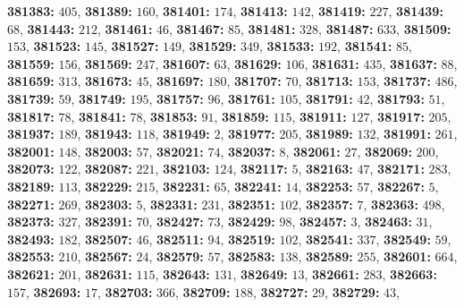 \textsf{\bfseries 381383:} $405$, \textsf{\bfseries 381389:} $160$, \textsf{\bfseries 381401:} $174$, \textsf{\bfseries 381413:} $142$, \textsf{\bfseries 381419:} $227$, \textsf{\bfseries 381439:} $68$, \textsf{\bfseries 381443:} $212$, \textsf{\bfseries 381461:} $46$, \textsf{\bfseries 381467:} $85$, \textsf{\bfseries 381481:} $328$, \textsf{\bfseries 381487:} $633$, \textsf{\bfseries 381509:} $153$, \textsf{\bfseries 381523:} $145$, \textsf{\bfseries 381527:} $149$, \textsf{\bfseries 381529:} $349$, \textsf{\bfseries 381533:} $192$, \textsf{\bfseries 381541:} $85$, \textsf{\bfseries 381559:} $156$, \textsf{\bfseries 381569:} $247$, \textsf{\bfseries 381607:} $63$, \textsf{\bfseries 381629:} $106$, \textsf{\bfseries 381631:} $435$, \textsf{\bfseries 381637:} $88$, \textsf{\bfseries 381659:} $313$, \textsf{\bfseries 381673:} $45$, \textsf{\bfseries 381697:} $180$, \textsf{\bfseries 381707:} $70$, \textsf{\bfseries 381713:} $153$, \textsf{\bfseries 381737:} $486$, \textsf{\bfseries 381739:} $59$, \textsf{\bfseries 381749:} $195$, \textsf{\bfseries 381757:} $96$, \textsf{\bfseries 381761:} $105$, \textsf{\bfseries 381791:} $42$, \textsf{\bfseries 381793:} $51$, \textsf{\bfseries 381817:} $78$, \textsf{\bfseries 381841:} $78$, \textsf{\bfseries 381853:} $91$, \textsf{\bfseries 381859:} $115$, \textsf{\bfseries 381911:} $127$, \textsf{\bfseries 381917:} $205$, \textsf{\bfseries 381937:} $189$, \textsf{\bfseries 381943:} $118$, \textsf{\bfseries 381949:} $2$, \textsf{\bfseries 381977:} $205$, \textsf{\bfseries 381989:} $132$, \textsf{\bfseries 381991:} $261$, \textsf{\bfseries 382001:} $148$, \textsf{\bfseries 382003:} $57$, \textsf{\bfseries 382021:} $74$, \textsf{\bfseries 382037:} $8$, \textsf{\bfseries 382061:} $27$, \textsf{\bfseries 382069:} $200$, \textsf{\bfseries 382073:} $122$, \textsf{\bfseries 382087:} $221$, \textsf{\bfseries 382103:} $124$, \textsf{\bfseries 382117:} $5$, \textsf{\bfseries 382163:} $47$, \textsf{\bfseries 382171:} $283$, \textsf{\bfseries 382189:} $113$, \textsf{\bfseries 382229:} $215$, \textsf{\bfseries 382231:} $65$, \textsf{\bfseries 382241:} $14$, \textsf{\bfseries 382253:} $57$, \textsf{\bfseries 382267:} $5$, \textsf{\bfseries 382271:} $269$, \textsf{\bfseries 382303:} $5$, \textsf{\bfseries 382331:} $231$, \textsf{\bfseries 382351:} $102$, \textsf{\bfseries 382357:} $7$, \textsf{\bfseries 382363:} $498$, \textsf{\bfseries 382373:} $327$, \textsf{\bfseries 382391:} $70$, \textsf{\bfseries 382427:} $73$, \textsf{\bfseries 382429:} $98$, \textsf{\bfseries 382457:} $3$, \textsf{\bfseries 382463:} $31$, \textsf{\bfseries 382493:} $182$, \textsf{\bfseries 382507:} $46$, \textsf{\bfseries 382511:} $94$, \textsf{\bfseries 382519:} $102$, \textsf{\bfseries 382541:} $337$, \textsf{\bfseries 382549:} $59$, \textsf{\bfseries 382553:} $210$, \textsf{\bfseries 382567:} $24$, \textsf{\bfseries 382579:} $57$, \textsf{\bfseries 382583:} $138$, \textsf{\bfseries 382589:} $255$, \textsf{\bfseries 382601:} $664$, \textsf{\bfseries 382621:} $201$, \textsf{\bfseries 382631:} $115$, \textsf{\bfseries 382643:} $131$, \textsf{\bfseries 382649:} $13$, \textsf{\bfseries 382661:} $283$, \textsf{\bfseries 382663:} $157$, \textsf{\bfseries 382693:} $17$, \textsf{\bfseries 382703:} $366$, \textsf{\bfseries 382709:} $188$, \textsf{\bfseries 382727:} $29$, \textsf{\bfseries 382729:} $43$, 
